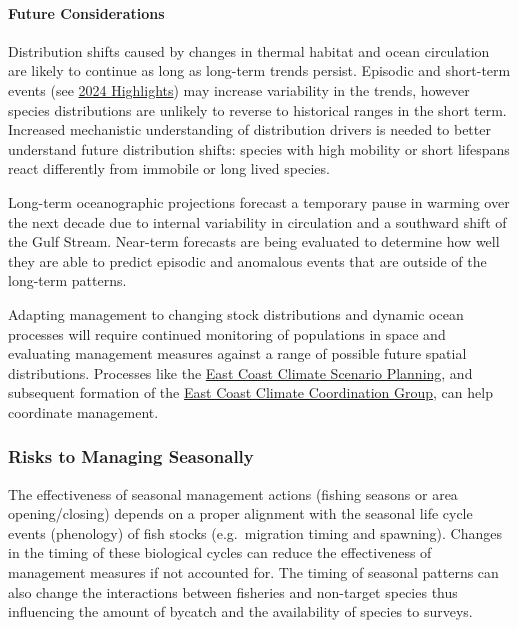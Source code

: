 \documentclass[
  10pt,
]{article}
\begin{document}
\hypertarget{future-considerations}{%
\paragraph{Future Considerations}\label{future-considerations}}

Distribution shifts caused by changes in thermal habitat and ocean circulation are likely to continue as long as long-term trends persist. Episodic and short-term events (see \protect\hyperlink{highlights}{2024 Highlights}) may increase variability in the trends, however species distributions are unlikely to reverse to historical ranges in the short term. Increased mechanistic understanding of distribution drivers is needed to better understand future distribution shifts: species with high mobility or short lifespans react differently from immobile or long lived species.

Long-term oceanographic projections forecast a temporary pause in warming over the next decade due to internal variability in circulation and a southward shift of the Gulf Stream. Near-term forecasts are being evaluated to determine how well they are able to predict episodic and anomalous events that are outside of the long-term patterns.

Adapting management to changing stock distributions and dynamic ocean processes will require continued monitoring of populations in space and evaluating management measures against a range of possible future spatial distributions. Processes like the \href{https://www.mafmc.org/climate-change-scenario-planning}{East Coast Climate Scenario Planning}, and subsequent formation of the \href{https://www.mafmc.org/e3cg}{East Coast Climate Coordination Group}, can help coordinate management.

\hypertarget{risks-to-managing-seasonally}{%
\subsubsection{Risks to Managing Seasonally}\label{risks-to-managing-seasonally}}

The effectiveness of seasonal management actions (fishing seasons or area opening/closing) depends on a proper alignment with the seasonal life cycle events (phenology) of fish stocks (e.g.~migration timing and spawning). Changes in the timing of these biological cycles can reduce the effectiveness of management measures if not accounted for. The timing of seasonal patterns can also change the interactions between fisheries and non-target species thus influencing the amount of bycatch and the availability of species to surveys.
\end{document}
